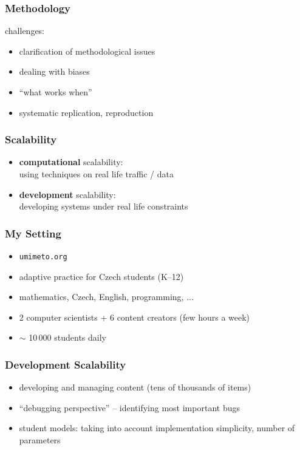 \documentclass[bigger]{beamer}
\begin{document}
\begin{frame}
  \frametitle{Methodology}

  challenges:
  \begin{itemize}
  \item clarification of methodological issues
  \item dealing with biases
  \item ``what works when''
  \item systematic replication, reproduction
  \end{itemize}
\end{frame}

\begin{frame}
  \frametitle{Scalability}

  \begin{itemize}
  \item \textbf{computational} scalability: \\
    using techniques on real life traffic / data
  \item \textbf{development} scalability:\\
    developing systems under real life constraints
  \end{itemize}
\end{frame}

\begin{frame}
  \frametitle{My Setting}

  \begin{itemize}
  \item \texttt{umimeto.org}
  \item adaptive practice for Czech students (K--12)
  \item mathematics, Czech, English, programming, ...
  \item 2 computer scientists + 6 content creators (few hours a week)
  \item $\sim$ 10\,000 students daily
  \end{itemize}
\end{frame}

\begin{frame}
  \frametitle{Development Scalability}

  \begin{itemize}
  \item developing and managing content (tens of thousands of items)
  \item ``debugging perspective'' -- identifying most important bugs
  \item student models: taking into account implementation simplicity, number
    of parameters
  \end{itemize}
\end{frame}
\end{document}
